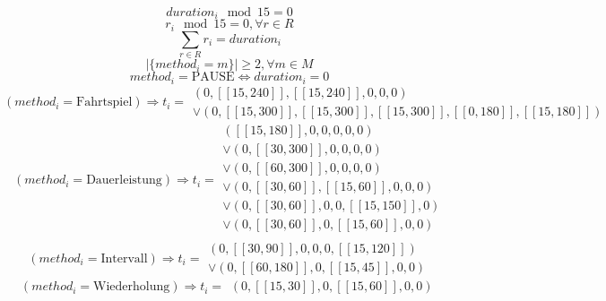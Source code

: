 \begin{equation*}
    {duration}_i \mod 15 = 0
\end{equation*} 
\begin{equation*}
    r_i \mod 15 = 0, \forall r \in R
\end{equation*}
\begin{equation*}
    \sum_{r\in R} r_i = duration_i
\end{equation*}
\begin{equation*} 
    |\{method_i = m\}| \geq 2, \forall m \in M
\end{equation*} 
\begin{equation*}
    method_i = \text{PAUSE} \Leftrightarrow duration_i = 0
\end{equation*}
\begin{equation*}
    (method_i = \text{Fahrtspiel})\Rightarrow t_i = \begin{array}{c}
            (0, [\![15, 240]\!], [\![15, 240]\!], 0, 0, 0) \\ 
        \vee (0, [\![15, 300]\!], [\![15, 300]\!], [\![15, 300]\!], [\![0, 180]\!], [\![15, 180]\!])
    \end{array}
\end{equation*}
\begin{equation*}
    (method_i = \text{Dauerleistung})\Rightarrow t_i = \begin{array}{c}
            ([\![15, 180]\!], 0, 0, 0, 0, 0) \\ 
            \vee (0, [\![30, 300]\!], 0, 0, 0, 0) \\  
            \vee (0, [\![60, 300]\!], 0, 0, 0, 0) \\  
            \vee (0, [\![30, 60]\!], [\![15, 60]\!], 0, 0, 0) \\  
            \vee (0, [\![30, 60]\!], 0, 0, [\![15, 150]\!], 0) \\
            \vee (0, [\![30, 60]\!], 0, [\![15, 60]\!], 0, 0) \\  
    \end{array}
\end{equation*}
\begin{equation*}
    (method_i = \text{Intervall})\Rightarrow t_i = \begin{array}{c}
            (0, [\![30, 90]\!], 0, 0, 0, [\![15, 120]\!]) \\ 
        \vee (0, [\![60,180]\!], 0, [\![15, 45]\!], 0, 0)
    \end{array}
\end{equation*}
\begin{equation*}
    (method_i = \text{Wiederholung})\Rightarrow t_i = \begin{array}{c}
            (0, [\![15, 30]\!], 0, [\![15, 60]\!], 0, 0)
    \end{array}
\end{equation*}
